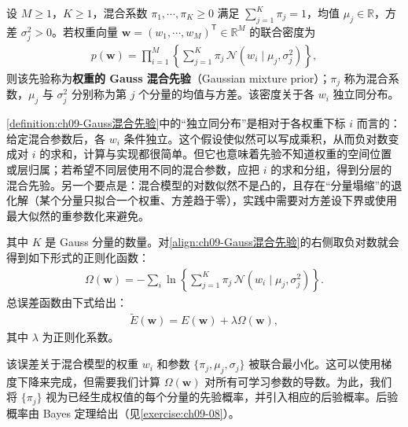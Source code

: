 \documentclass[../../main.tex]{subfiles}
\begin{document}
\begin{definition}\label{definition:ch09-Gauss混合先验}
设 $M\geqslant1$，$K\geqslant1$，混合系数 $\pi_{1},\cdots,\pi_{K}\geqslant0$ 满足 $\sum_{j=1}^{K}\pi_{j}=1$，均值 $\mu_{j}\in\mathbb{R}$，方差 $\sigma_{j}^{2}>0$。若权重向量 $\boldsymbol{w}=(w_{1},\cdots,w_{M})^{\mathsf T}\in\mathbb{R}^{M}$ 的联合密度为
\begin{align*}
p(\boldsymbol{w})=\prod_{i=1}^{M}\left\{\sum_{j=1}^{K}\pi_{j}\,\mathcal{N}\!\left(w_{i}\mid\mu_{j},\sigma_{j}^{2}\right)\right\},
\end{align*}
则该先验称为\textbf{权重的 Gauss 混合先验}（Gaussian mixture prior）；$\pi_{j}$ 称为混合系数，$\mu_{j}$ 与 $\sigma_{j}^{2}$ 分别称为第 $j$ 个分量的均值与方差。该密度关于各 $w_{i}$ 独立同分布。
\end{definition}

\begin{remark}\cref{definition:ch09-Gauss混合先验}中的“独立同分布”是相对于各权重下标 $i$ 而言的：给定混合参数后，各 $w_{i}$ 条件独立。这个假设使似然可以写成乘积，从而负对数变成对 $i$ 的求和，计算与实现都很简单。但它也意味着先验不知道权重的空间位置或层归属；若希望不同层使用不同的混合参数，应把 $i$ 的求和分组，得到分层的混合先验。另一个要点是：混合模型的对数似然不是凸的，且存在“分量塌缩”的退化解（某个分量只拟合一个权重、方差趋于零），实践中需要对方差设下界或使用最大似然的重参数化来避免。
\end{remark}

其中 $K$ 是 Gauss 分量的数量。对\eqref{align:ch09-Gauss混合先验}的右侧取负对数就会得到如下形式的正则化函数：
\begin{align}
\Omega(\boldsymbol{w})=-\sum_{i}\ln\left\{\sum_{j=1}^{K}\pi_{j}\,\mathcal{N}\!\left(w_{i}\mid\mu_{j},\sigma_{j}^{2}\right)\right\}.
\label{align:ch09-软共享正则}
\end{align}
总误差函数由下式给出：
\begin{align}
\widetilde{E}(\boldsymbol{w})=E(\boldsymbol{w})+\lambda\Omega(\boldsymbol{w}),
\label{align:ch09-软共享总误差}
\end{align}
其中 $\lambda$ 为正则化系数。

该误差关于混合模型的权重 $w_{i}$ 和参数 $\{\pi_{j},\mu_{j},\sigma_{j}\}$ 被联合最小化。这可以使用梯度下降来完成，但需要我们计算 $\Omega(\boldsymbol{w})$ 对所有可学习参数的导数。为此，我们将 $\{\pi_{j}\}$ 视为已经生成权值的每个分量的先验概率，并引入相应的后验概率。后验概率由 Bayes 定理给出（见\cref{exercise:ch09-08}）。
\end{document}
